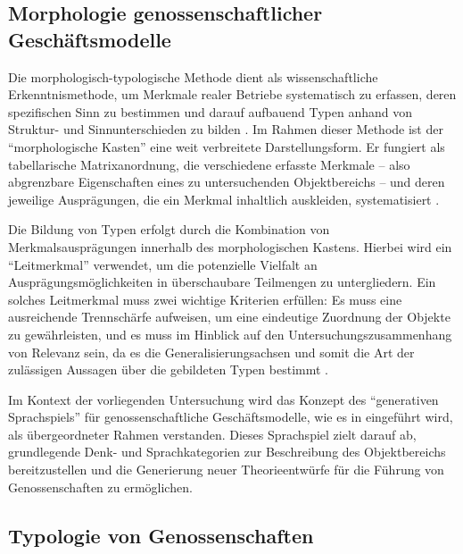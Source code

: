 \subsection{Morphologie genossenschaftlicher Geschäftsmodelle}

Die morphologisch-typologische Methode dient als wissenschaftliche Erkenntnismethode, um Merkmale realer Betriebe systematisch zu erfassen, deren spezifischen Sinn zu bestimmen und darauf aufbauend Typen anhand von Struktur- und Sinnunterschieden zu bilden \autocite{blome-dreesGenossenschaftlicheGeschaeftsmodelleSemantik2023}. Im Rahmen dieser Methode ist der \enquote{morphologische Kasten} eine weit verbreitete Darstellungsform. Er fungiert als tabellarische Matrixanordnung, die verschiedene erfasste Merkmale – also abgrenzbare Eigenschaften eines zu untersuchenden Objektbereichs – und deren jeweilige Ausprägungen, die ein Merkmal inhaltlich auskleiden, systematisiert \autocite{blome-dreesGenossenschaftlicheGeschaeftsmodelleSemantik2023}.

Die Bildung von Typen erfolgt durch die Kombination von Merkmalsausprägungen innerhalb des morphologischen Kastens. Hierbei wird ein \enquote{Leitmerkmal} verwendet, um die potenzielle Vielfalt an Ausprägungsmöglichkeiten in überschaubare Teilmengen zu untergliedern. Ein solches Leitmerkmal muss zwei wichtige Kriterien erfüllen: Es muss eine ausreichende Trennschärfe aufweisen, um eine eindeutige Zuordnung der Objekte zu gewährleisten, und es muss im Hinblick auf den Untersuchungszusammenhang von Relevanz sein, da es die Generalisierungsachsen und somit die Art der zulässigen Aussagen über die gebildeten Typen bestimmt \autocite{blome-dreesGenossenschaftlicheGeschaeftsmodelleSemantik2023}.

Im Kontext der vorliegenden Untersuchung wird das Konzept des \enquote{generativen Sprachspiels} für genossenschaftliche Geschäftsmodelle, wie es in \textcite{blome-dreesGenossenschaftlicheGeschaeftsmodelleSemantik2023} eingeführt wird, als übergeordneter Rahmen verstanden. Dieses Sprachspiel zielt darauf ab, grundlegende Denk- und Sprachkategorien zur Beschreibung des Objektbereichs bereitzustellen und die Generierung neuer Theorieentwürfe für die Führung von Genossenschaften zu ermöglichen.



\subsection{Typologie von Genossenschaften}

